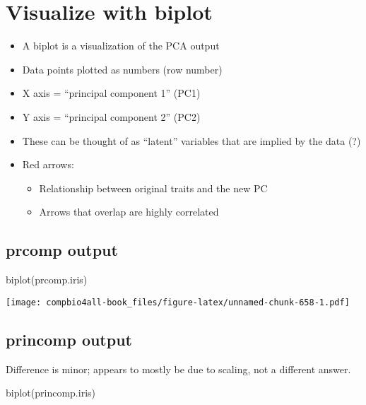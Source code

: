 \documentclass[
]{book}
\newenvironment{Shaded}{\begin{snugshade}}{\end{snugshade}}
\newcommand{\FunctionTok}[1]{\textcolor[rgb]{0.00,0.00,0.00}{#1}}
\newcommand{\NormalTok}[1]{#1}
\providecommand{\tightlist}{%
  \setlength{\itemsep}{0pt}\setlength{\parskip}{0pt}}
\begin{document}
\hypertarget{visualize-with-biplot}{%
\section{Visualize with biplot}\label{visualize-with-biplot}}

\begin{itemize}
\tightlist
\item
  A biplot is a visualization of the PCA output
\item
  Data points plotted as numbers (row number)
\item
  X axis = ``principal component 1'' (PC1)
\item
  Y axis = ``principal component 2'' (PC2)
\item
  These can be thought of as ``latent'' variables that are implied by the data (?)
\item
  Red arrows:

  \begin{itemize}
  \tightlist
  \item
    Relationship between original traits and the new PC
  \item
    Arrows that overlap are highly correlated
  \end{itemize}
\end{itemize}

\hypertarget{prcomp-output}{%
\subsection{prcomp output}\label{prcomp-output}}

\begin{Shaded}
\begin{Highlighting}[]
\FunctionTok{biplot}\NormalTok{(prcomp.iris)}
\end{Highlighting}
\end{Shaded}

\texttt{[image: compbio4all-book\_files/figure-latex/unnamed-chunk-658-1.pdf]}

\hypertarget{princomp-output}{%
\subsection{princomp output}\label{princomp-output}}

Difference is minor; appears to mostly be due to scaling, not a different answer.

\begin{Shaded}
\begin{Highlighting}[]
\FunctionTok{biplot}\NormalTok{(princomp.iris)}
\end{Highlighting}
\end{Shaded}
\end{document}
